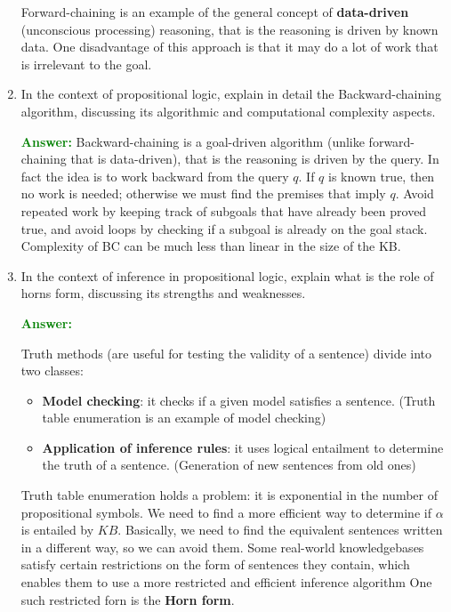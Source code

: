 \documentclass[12pt]{article}
\begin{document}
\begin{enumerate}[label=\textbf{PL.\arabic*}]
    Forward-chaining is an example of the general concept of \textbf{data-driven} (unconscious processing) reasoning, that is the reasoning is driven by known data.
    One disadvantage of this approach is that it may do a lot of work that is irrelevant to the goal.

    \item In the context of propositional logic, explain in detail the Backward-chaining algorithm, discussing its algorithmic and computational complexity aspects.
    
    \textcolor{green}{\textbf{Answer:}}
    Backward-chaining is a goal-driven algorithm (unlike forward-chaining that is data-driven), that is the reasoning is driven by the query.
    In fact the idea is to work backward from the query $q$.
    If $q$ is known true, then no work is needed; otherwise we must find the premises that imply $q$.
    Avoid repeated work by keeping track of subgoals that have already been proved true, 
    and avoid loops by checking if a subgoal is already on the goal stack.
    Complexity of BC can be much less than linear in the size of the KB\@.
    \item In the context of inference in propositional logic, explain what is the role of horns form, discussing its strengths and weaknesses.
    
    \textcolor{green}{\textbf{Answer:}}
    
    Truth methods (are useful for testing the validity of a sentence) divide into two classes:
    \begin{itemize}
        \item \textbf{Model checking}: it checks if a given model satisfies a sentence. (Truth table enumeration is an example of model checking)
        \item \textbf{Application of inference rules}: it uses logical entailment to determine the truth of a sentence. (Generation of new sentences from old ones)
    \end{itemize}

    Truth table enumeration holds a problem: it is exponential in the number of propositional symbols.
    We need to find a more efficient way to determine if $\alpha$ is entailed by $KB$.
    Basically, we need to find the equivalent sentences written in a different way, so we can avoid them.
    Some real-world knowledgebases satisfy certain restrictions on the form of sentences  they contain, 
    which enables them to use a more restricted and efficient inference algorithm
    One such restricted forn is the \textbf{Horn form}.


\end{enumerate}
\end{document}
